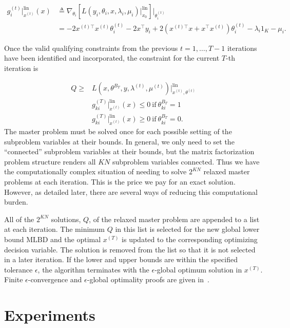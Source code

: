 \documentclass{article} %
\newcommand{\T}{\ensuremath{\top}}
\renewcommand{\leq}{\leqslant}
\renewcommand{\geq}{\geqslant}
\begin{document}
\begin{equation}
	\begin{split}
		g^{(t)}_i\big\vert^{\text{lin}}_{x^{(t)}}(x) &\triangleq \nabla_{\theta_i} \left[ L(y_i, \theta_i, x, \lambda_i, \mu_i) \bigg|^{\text{lin}}_{x_0} \right] \bigg|_{\theta_i^{(t)}} \\
		& = -2 x^{(t)\T} x^{(t)} \theta_i^{(t)} -2 x^\T y_i + 2 (x^{(t)\T} x + x^\T x^{(t)}) \theta_i^{(t)} - \lambda_i 1_K - \mu_i.
\end{split}
\end{equation}

Once the valid qualifying constraints from the previous
$t=1,\ldots,T-1$ iterations have been identified and
incorporated, the constraint for the current $T$-th iteration
is

\begin{eqnarray*}
Q \geq & L(x,\theta^{B_T}, y, \lambda^{(t)},\mu^{(t)})\big\vert^{\text{lin}}_{x^{(t)}, \theta^{(t)}}\\
&g_{ki}^{(T)}\big\vert^{\text{lin}}_{x^{(t)}}(x) \leq 0 \ \text{if}\ \theta^{B_T}_{ki} = 1 \\
&g_{ki}^{(T)}\big\vert^{\text{lin}}_{x^{(t)}}(x) \geq 0 \ \text{if}\ \theta^{B_T}_{ki} = 0.
\end{eqnarray*}
The master problem must be solved once for each possible setting of the
subproblem variables at their bounds. In general, we only need to set the
``connected'' subproblem variables at their bounds, but the matrix
factorization problem structure renders all $KN$ subproblem variables
connected. Thus we have the computationally complex situation of needing to
solve $2^{KN}$ relaxed master problems at each iteration. This is the price we
pay for an exact solution. However, as detailed later, there are several ways
of reducing this computational burden.

All of the $2^{KN}$ solutions, $Q$, of the relaxed master problem are appended
to a list at each iteration. The minimum $Q$ in this list is selected for the
new global lower bound $\text{MLBD}$ and the optimal $x^{(T)}$ is updated to
the corresponding optimizing decision variable. The solution is removed from
the list so that it is not selected in a later iteration. If the lower and
upper bounds are within the specified tolerance $\epsilon$, the algorithm
terminates with the $\epsilon$-global optimum solution in $x^{(T)}$. Finite
$\epsilon$-convergence and $\epsilon$-global optimality proofs are given
in~\cite{Floudas1994}.

\section{Experiments}\label{sec:results}
\end{document}
